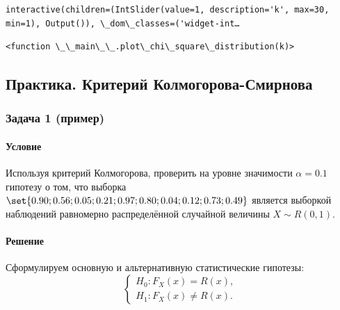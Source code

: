 \documentclass[11pt]{article}
\makeatletter
\newcommand{\boxspacing}{\kern\kvtcb@left@rule\kern\kvtcb@boxsep}
\newcommand{\prompt}[4]{
        {\ttfamily\llap{{\color{#2}[#3]:\hspace{3pt}#4}}\vspace{-\baselineskip}}
    }
\makeatother
\begin{document}
    
    \begin{Verbatim}[commandchars=\\\{\}]
interactive(children=(IntSlider(value=1, description='k', max=30, min=1), Output()), \_dom\_classes=('widget-int…
    \end{Verbatim}

    
            \begin{tcolorbox}[breakable, size=fbox, boxrule=.5pt, pad at break*=1mm, opacityfill=0]
\prompt{Out}{outcolor}{5}{\boxspacing}
\begin{Verbatim}[commandchars=\\\{\}]
<function \_\_main\_\_.plot\_chi\_square\_distribution(k)>
\end{Verbatim}
\end{tcolorbox}
        
    \subsection{Практика. Критерий
Колмогорова-Смирнова}\label{ux43fux440ux430ux43aux442ux438ux43aux430.-ux43aux440ux438ux442ux435ux440ux438ux439-ux43aux43eux43bux43cux43eux433ux43eux440ux43eux432ux430-ux441ux43cux438ux440ux43dux43eux432ux430}

    \subsubsection{Задача 1
(пример)}\label{ux437ux430ux434ux430ux447ux430-1-ux43fux440ux438ux43cux435ux440}

\paragraph{Условие}\label{ux443ux441ux43bux43eux432ux438ux435}

Используя критерий Колмогорова, проверить на уровне значимости
\(\alpha=0.1\) гипотезу о том, что выборка
\(\set{0.90; 0.56; 0.05; 0.21; 0.97; 0.80; 0.04; 0.12; 0.73; 0.49}\)
является выборкой наблюдений равномерно распределённой случайной
величины \(X \sim R(0, 1)\).

\paragraph{Решение}\label{ux440ux435ux448ux435ux43dux438ux435}

Сформулируем основную и альтернативную статистические гипотезы: \[
\begin{cases}
H_0: F_X(x) = R(x), \\
H_1: F_X(x)\neq R(x).
\end{cases}
\]
\end{document}
